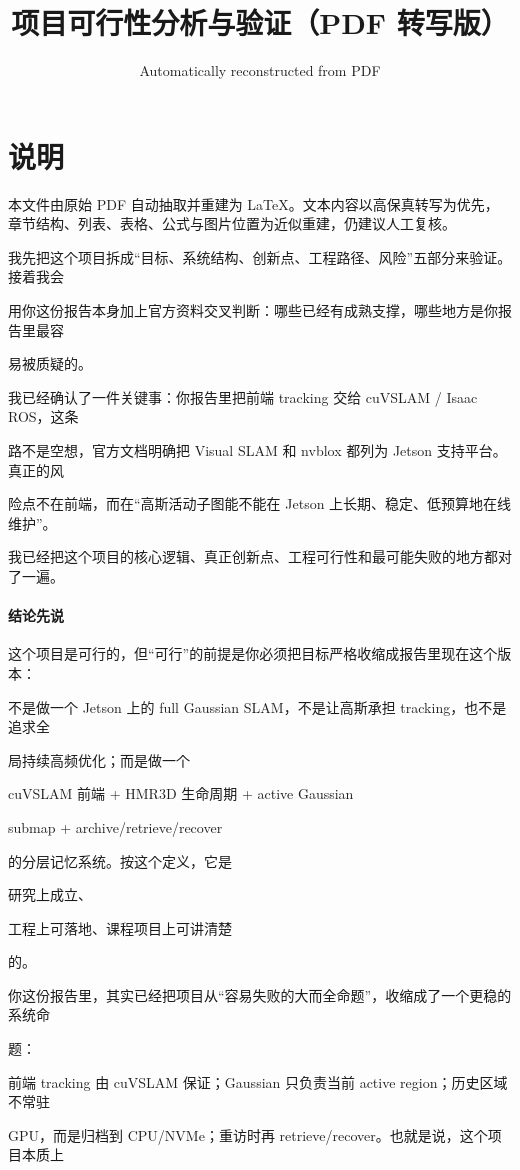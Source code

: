 \documentclass[12pt]{article}
\title{项目可行性分析与验证（PDF 转写版）}
\author{Automatically reconstructed from PDF}
\date{}
\begin{document}
\maketitle

\section*{说明}
本文件由原始 PDF 自动抽取并重建为 LaTeX。文本内容以高保真转写为优先，章节结构、列表、表格、公式与图片位置为近似重建，仍建议人工复核。

我先把这个项目拆成“目标、系统结构、创新点、工程路径、风险”五部分来验证。接着我会

用你这份报告本身加上官方资料交叉判断：哪些已经有成熟支撑，哪些地方是你报告里最容

易被质疑的。

我已经确认了一件关键事：你报告里把前端 tracking 交给 cuVSLAM / Isaac ROS，这条

路不是空想，官方文档明确把 Visual SLAM 和 nvblox 都列为 Jetson 支持平台。真正的风

险点不在前端，而在“高斯活动子图能不能在 Jetson 上长期、稳定、低预算地在线维护”。

我已经把这个项目的核心逻辑、真正创新点、工程可行性和最可能失败的地方都对了一遍。

\paragraph{结论先说}
这个项目是可行的，但“可行”的前提是你必须把目标严格收缩成报告里现在这个版本：

不是做一个 Jetson 上的 full Gaussian SLAM，不是让高斯承担 tracking，也不是追求全

局持续高频优化；而是做一个

cuVSLAM 前端 + HMR3D 生命周期 + active Gaussian

submap + archive/retrieve/recover

的分层记忆系统。按这个定义，它是

研究上成立、

工程上可落地、课程项目上可讲清楚

的。

你这份报告里，其实已经把项目从“容易失败的大而全命题”，收缩成了一个更稳的系统命

题：

前端 tracking 由 cuVSLAM 保证；Gaussian 只负责当前 active region；历史区域不常驻

GPU，而是归档到 CPU/NVMe；重访时再 retrieve/recover。也就是说，这个项目本质上
\end{document}
